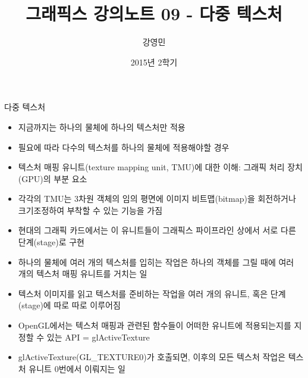 \documentclass{beamer}
\title[3D 그래픽스 프로그래밍]{그래픽스 강의노트 09 - 다중 텍스처}
\author{강영민}
\institute{동명대학교}
\date{2015년 2학기}
\begin{document}
\begin{frame}
  \titlepage
\end{frame}






\begin{frame}[fragile]{다중 텍스처}

\begin{itemize}
\item 지금까지는 하나의 물체에 하나의 텍스처만 적용
\item 필요에 따라 다수의 텍스처를 하나의 물체에 적용해야할 경우
\item 텍스처 매핑 유니트(texture mapping unit, TMU)에 대한 이해: 그래픽 처리 장치(GPU)의 부분 요소
\item 각각의 TMU는 3차원 객체의 임의 평면에 이미지 비트맵(bitmap)을 회전하거나 크기조정하여 부착할 수 있는 기능을 가짐
\item 현대의 그래픽 카드에서는 이 유니트들이 그래픽스 파이프라인 상에서 서로 다른 단계(stage)로 구현
\item 하나의 물체에 여러 개의 텍스처를 입히는 작업은 하나의 객체를 그릴 때에 여러 개의 텍스처 매핑 유니트를 거치는 일
\item 텍스처 이미지를 읽고 텍스처를 준비하는 작업을 여러 개의 유니트, 혹은 단계(stage)에 따로 따로 이루어짐
\item OpenGL에서는 텍스처 매핑과 관련된 함수들이 어떠한 유니트에 적용되는지를 지정할 수 있는 API = {\sf glActiveTexture}
\item {\sf glActiveTexture(GL\_TEXTURE0)}가 호출되면, 이후의 모든 텍스처 작업은 텍스처 유니트 0번에서 이뤄지는 일
\end{itemize}


\end{frame}
\end{document}
